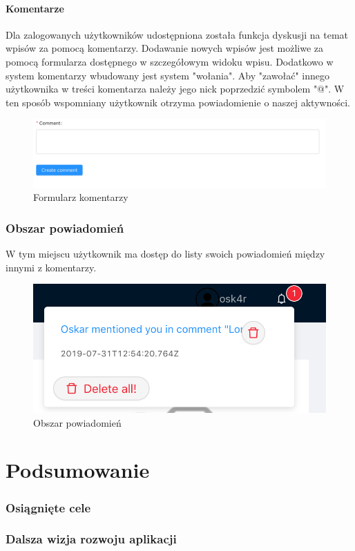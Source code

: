 \documentclass[declaration,shortabstract]{iithesis}
\begin{document}
\subsubsection{Komentarze}
Dla zalogowanych użytkowników udostępniona została funkcja dyskusji na temat wpisów za pomocą komentarzy. Dodawanie nowych wpisów jest możliwe za pomocą formularza dostępnego w szczegółowym widoku wpisu. Dodatkowo w system komentarzy wbudowany jest system "wołania". Aby "zawołać" innego użytkownika w treści komentarza należy jego nick poprzedzić symbolem "@". W ten sposób wspomniany użytkownik otrzyma powiadomienie o naszej aktywności.

\begin{figure}
    \centering
    \includegraphics[width=\linewidth]{images/komentarz.png}
    \caption{Formularz komentarzy}
    \label{fig:my_label}
\end{figure}

\subsection{Obszar powiadomień}
W tym miejscu użytkownik ma dostęp do listy swoich powiadomień między innymi z komentarzy.
\begin{figure}
    \centering
    \includegraphics[width=\linewidth]{images/powiadomienia.png}
    \caption{Obszar powiadomień}
    \label{fig:my_label}
\end{figure}
\chapter{Podsumowanie}
\subsection{Osiągnięte cele}
\subsection{Dalsza wizja rozwoju aplikacji}


\end{document}
